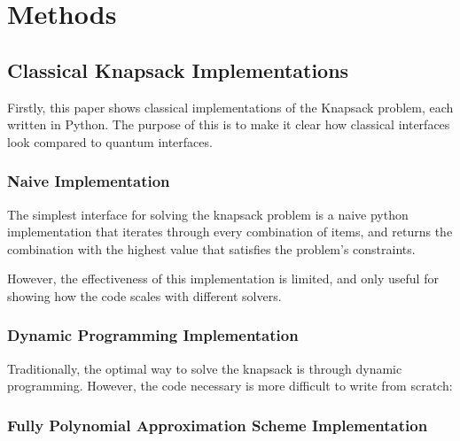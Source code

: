 \documentclass{article}
\begin{document}
\section{Methods}

\subsection{Classical Knapsack Implementations}

Firstly, this paper shows classical implementations of the Knapsack problem, each written in Python.
The purpose of this is to make it clear how classical interfaces look compared to quantum interfaces.

\subsubsection{Naive Implementation}

The simplest interface for solving the knapsack problem is a naive python implementation that iterates through every combination of items, and returns the combination with the highest value that satisfies the problem's constraints.
\lstset{language=Python}

However, the effectiveness of this implementation is limited, and only useful for showing how the code scales with different solvers.
\newpage

\subsubsection{Dynamic Programming Implementation}

Traditionally, the optimal way to solve the knapsack is through dynamic programming.
However, the code necessary is more difficult to write from scratch:

\lstset{language=Python}

\newpage

\subsubsection{Fully Polynomial Approximation Scheme Implementation}
\end{document}
